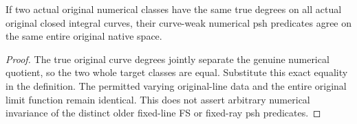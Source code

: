 \begin{theorem}
\label{thm:native-numerical-curve-weak-psh-intrinsic}
\leanok
{}
If two actual original numerical classes have the same true degrees on
all actual original closed integral curves, their curve-weak numerical
psh predicates agree on the same entire original native space.
\end{theorem}
\begin{proof}
The true original curve degrees jointly separate the genuine numerical
quotient, so the two whole target classes are equal. Substitute this exact
equality in the definition. The permitted varying original-line data and
the entire original limit function remain identical. This does not assert
arbitrary numerical invariance of the distinct older fixed-line FS or
fixed-ray psh predicates.
\end{proof}

